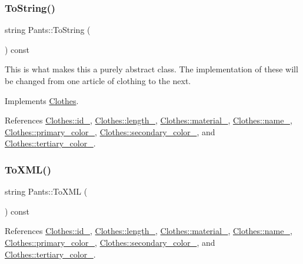 \subsubsection{\texorpdfstring{To\+String()}{ToString()}}
{\footnotesize\ttfamily string Pants\+::\+To\+String (\begin{DoxyParamCaption}{ }\end{DoxyParamCaption}) const\hspace{0.3cm}{\ttfamily [virtual]}}

This is what makes this a purely abstract class. The implementation of these will be changed from one article of clothing to the next. 

Implements \mbox{\hyperlink{classClothes_a953d143394e9a2c007ab0c3a638973cf}{Clothes}}.



References \mbox{\hyperlink{classClothes_a8978d931db5ca47c3ccea30def4ae83e}{Clothes\+::id\+\_\+}}, \mbox{\hyperlink{classClothes_ae02603eda727e33caf46ec30e761e3c3}{Clothes\+::length\+\_\+}}, \mbox{\hyperlink{classClothes_adbb9ed311f14ccbb1e4fe0e8378a95d4}{Clothes\+::material\+\_\+}}, \mbox{\hyperlink{classClothes_a7f2275aaae24224d60c48af922c31b65}{Clothes\+::name\+\_\+}}, \mbox{\hyperlink{classClothes_a7cb005bf6cbb7f4eaa40f1b31817559c}{Clothes\+::primary\+\_\+color\+\_\+}}, \mbox{\hyperlink{classClothes_ab8f55f67b956b25d71260cffcf273673}{Clothes\+::secondary\+\_\+color\+\_\+}}, and \mbox{\hyperlink{classClothes_a3c5f1e7ab531e3ba7a38b930da8078a0}{Clothes\+::tertiary\+\_\+color\+\_\+}}.

\mbox{\label{classPants_aa62270b70cbb40b7b420f1091ad7e43b}} 
\subsubsection{\texorpdfstring{To\+X\+M\+L()}{ToXML()}}
{\footnotesize\ttfamily string Pants\+::\+To\+X\+ML (\begin{DoxyParamCaption}{ }\end{DoxyParamCaption}) const}



References \mbox{\hyperlink{classClothes_a8978d931db5ca47c3ccea30def4ae83e}{Clothes\+::id\+\_\+}}, \mbox{\hyperlink{classClothes_ae02603eda727e33caf46ec30e761e3c3}{Clothes\+::length\+\_\+}}, \mbox{\hyperlink{classClothes_adbb9ed311f14ccbb1e4fe0e8378a95d4}{Clothes\+::material\+\_\+}}, \mbox{\hyperlink{classClothes_a7f2275aaae24224d60c48af922c31b65}{Clothes\+::name\+\_\+}}, \mbox{\hyperlink{classClothes_a7cb005bf6cbb7f4eaa40f1b31817559c}{Clothes\+::primary\+\_\+color\+\_\+}}, \mbox{\hyperlink{classClothes_ab8f55f67b956b25d71260cffcf273673}{Clothes\+::secondary\+\_\+color\+\_\+}}, and \mbox{\hyperlink{classClothes_a3c5f1e7ab531e3ba7a38b930da8078a0}{Clothes\+::tertiary\+\_\+color\+\_\+}}.



